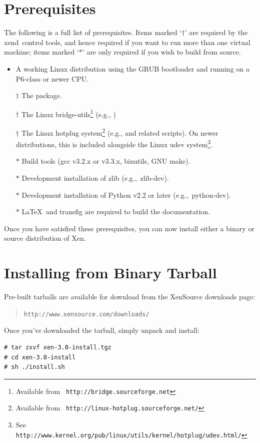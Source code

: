 \documentclass[11pt,twoside,final,openright]{report}
\def\xend{{xend}\xspace}
\begin{document}
\section{Prerequisites}
\label{sec:prerequisites}

The following is a full list of prerequisites. Items marked `$\dag$' are
required by the \xend\ control tools, and hence required if you want to
run more than one virtual machine; items marked `$*$' are only required
if you wish to build from source.
\begin{itemize}
\item A working Linux distribution using the GRUB bootloader and running
  on a P6-class or newer CPU\@.
\item [$\dag$] The  package.
\item [$\dag$] The Linux bridge-utils\footnote{Available from {\tt
      http://bridge.sourceforge.net}} (e.g., )
\item [$\dag$] The Linux hotplug system\footnote{Available from {\tt
      http://linux-hotplug.sourceforge.net/}} (e.g.,
       and related scripts).  On newer distributions,
      this is included alongside the Linux udev system\footnote{See {\tt
      http://www.kernel.org/pub/linux/utils/kernel/hotplug/udev.html/}}.
\item [$*$] Build tools (gcc v3.2.x or v3.3.x, binutils, GNU make).
\item [$*$] Development installation of zlib (e.g.,\ zlib-dev).
\item [$*$] Development installation of Python v2.2 or later (e.g.,\
  python-dev).
\item [$*$] \LaTeX\ and transfig are required to build the
  documentation.
\end{itemize}

Once you have satisfied these prerequisites, you can now install either
a binary or source distribution of Xen.

\section{Installing from Binary Tarball}

Pre-built tarballs are available for download from the XenSource downloads
page:
\begin{quote} {\tt http://www.xensource.com/downloads/}
\end{quote}

Once you've downloaded the tarball, simply unpack and install:
\begin{verbatim}
# tar zxvf xen-3.0-install.tgz
# cd xen-3.0-install
# sh ./install.sh
\end{verbatim}
\end{document}

